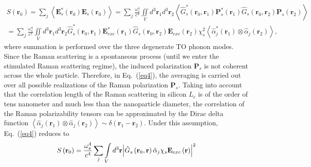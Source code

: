         \begin{align} %
            S\left( {{{\mathbf{r}}_0}} \right)
                =  \sum\limits_j {\left \langle{{\mathbf{E}}_s^*\left( {{{\mathbf{r}}_0}} \right){{\mathbf{E}}_s}\left( {{{\mathbf{r}}_0}} \right)} \right\rangle}
                = \sum\limits_j {\frac{{\omega _s^4}}{{{c^4}}}\iint\limits_V {{d^3}{{\mathbf{r}}_1}{d^3}{{\mathbf{r}}_2}\left\langle {\hat G_s^*\left( {{{\mathbf{r}}_0},{{\mathbf{r}}_1}} \right){\mathbf{P}}_s^*\left( {{{\mathbf{r}}_1}} \right){{\hat G}_s}\left( {{{\mathbf{r}}_0},{{\mathbf{r}}_2}} \right){{\mathbf{P}}_s}\left( {{{\mathbf{r}}_2}} \right)} \right\rangle }}  \\
                = \sum\limits_j {\frac{{\omega _s^4}}{{{c^4}}}\iint\limits_V {{d^3}{{\mathbf{r}}_1}{d^3}{{\mathbf{r}}_2}\hat G_s^*\left( {{{\mathbf{r}}_0},{{\mathbf{r}}_1}} \right){\mathbf{E}}_{exc}^*\left( {{{\mathbf{r}}_1}} \right){{\hat G}_s}\left( {{{\mathbf{r}}_0},{{\mathbf{r}}_2}} \right){{\mathbf{E}}_{exc}}\left( {{{\mathbf{r}}_2}} \right)\chi _s^2\left\langle {\hat \alpha _j^*\left( {{{\mathbf{r}}_1}} \right) \otimes {{\hat \alpha }_j}\left( {{{\mathbf{r}}_2}} \right)} \right\rangle }},
            \label{eq4}
        \end{align}
        where summation is performed over the three degenerate TO phonon modes. Since the Raman scattering is a spontaneous process
        (until we enter the stimulated Raman scattering regime), the  induced polarization $\mathbf{P}_s$ is not coherent across
        the whole particle. Therefore, in Eq.~(\ref{eq4}), the averaging is carried out over all possible realizations of the Raman
        polarization $\mathbf{P}_s$. Taking into account that the correlation length of the Raman scattering in silicon $L_c$ is of
        the order of tens nanometer and much less than the nanoparticle diameter, the correlation of the Raman
        polarizability tensors can be approximated by the Dirac delta function
        $\left\langle {\hat \alpha_j \left( {{{\mathbf{r}}_1}} \right) \otimes \hat \alpha_j \left( {{{\mathbf{r}}_2}} \right)} \right\rangle \sim \delta \left({{\mathbf{r}_1} - {\mathbf{r}_2}} \right)$.
        Under this assumption, Eq.~(\ref{eq4}) reduces to
        \begin{align}
            S\left( {{{\bf{r}}_0}} \right) = \frac{{\omega _s^4}}{{{c^4}}}\sum\limits_j {\int\limits_V {{d^3}{\bf{r}}{{\left| {{{\hat G}_s}\left(
            {{{\bf{r}}_0},{\bf{r}}} \right){{\hat \alpha }_j}{\chi _s}{{\bf{E}}_{exc}}\left( {\bf{r}} \right)} \right|}^2}} }
            \label{eq5}
        \end{align}
